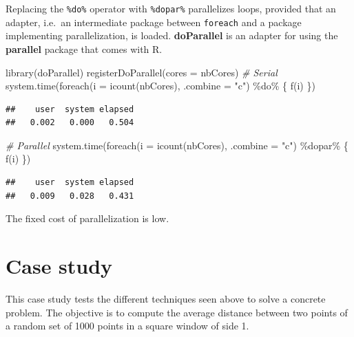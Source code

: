 \documentclass[
  12pt,
  american,
  a4paper,
  extrafontsizes,onecolumn,openright
  ]{memoir}
\newenvironment{Shaded}{\begin{snugshade}}{\end{snugshade}}
\newcommand{\AttributeTok}[1]{\textcolor[rgb]{0.77,0.63,0.00}{#1}}
\newcommand{\CommentTok}[1]{\textcolor[rgb]{0.56,0.35,0.01}{\textit{#1}}}
\newcommand{\FunctionTok}[1]{\textcolor[rgb]{0.00,0.00,0.00}{#1}}
\newcommand{\NormalTok}[1]{#1}
\newcommand{\SpecialCharTok}[1]{\textcolor[rgb]{0.00,0.00,0.00}{#1}}
\newcommand{\StringTok}[1]{\textcolor[rgb]{0.31,0.60,0.02}{#1}}
\begin{document}
Replacing the \texttt{\%do\%} operator with \texttt{\%dopar\%} parallelizes loops, provided that an adapter, i.e.~an intermediate package between \texttt{foreach} and a package implementing parallelization, is loaded.
\textbf{doParallel} is an adapter for using the \textbf{parallel} package that comes with R.

\scriptsize

\begin{Shaded}
\begin{Highlighting}[]
\FunctionTok{library}\NormalTok{(doParallel)}
\FunctionTok{registerDoParallel}\NormalTok{(}\AttributeTok{cores =}\NormalTok{ nbCores)}
\CommentTok{\# Serial}
\FunctionTok{system.time}\NormalTok{(}\FunctionTok{foreach}\NormalTok{(}\AttributeTok{i =} \FunctionTok{icount}\NormalTok{(nbCores), }\AttributeTok{.combine =} \StringTok{"c"}\NormalTok{) }\SpecialCharTok{\%do\%}
\NormalTok{    \{}
        \FunctionTok{f}\NormalTok{(i)}
\NormalTok{    \})}
\end{Highlighting}
\end{Shaded}

\begin{verbatim}
##    user  system elapsed 
##   0.002   0.000   0.504
\end{verbatim}

\begin{Shaded}
\begin{Highlighting}[]
\CommentTok{\# Parallel}
\FunctionTok{system.time}\NormalTok{(}\FunctionTok{foreach}\NormalTok{(}\AttributeTok{i =} \FunctionTok{icount}\NormalTok{(nbCores), }\AttributeTok{.combine =} \StringTok{"c"}\NormalTok{) }\SpecialCharTok{\%dopar\%}
\NormalTok{    \{}
        \FunctionTok{f}\NormalTok{(i)}
\NormalTok{    \})}
\end{Highlighting}
\end{Shaded}

\begin{verbatim}
##    user  system elapsed 
##   0.009   0.028   0.431
\end{verbatim}

\normalsize

The fixed cost of parallelization is low.

\hypertarget{sec:cas}{%
\section{Case study}\label{sec:cas}}

This case study tests the different techniques seen above to solve a concrete problem.
The objective is to compute the average distance between two points of a random set of 1000 points in a square window of side 1.
\end{document}

